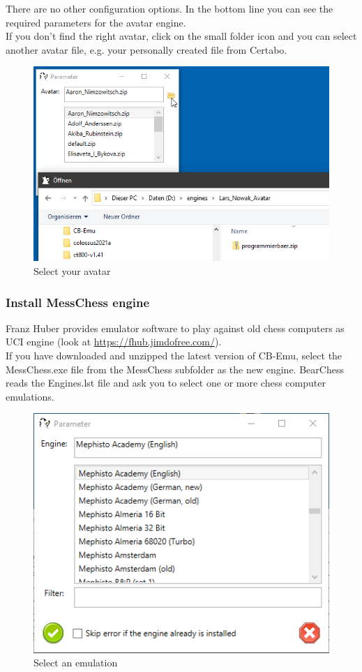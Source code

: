 \documentclass[11pt,a4paper]{article}
\begin{document}
	There are no other configuration options. In the bottom line you can see the required parameters for the avatar engine.\\
	If you don't find the right avatar, click on the small folder icon and you can select another avatar file, e.g. your personally created file from Certabo.
	
	\begin{figure}[H]
		\centering
		\includegraphics[scale=0.7]{avatar4.png}
		\caption{Select your avatar}
		\label{fig:Avatar4}
	\end{figure}
	
	\subsubsection{Install MessChess engine}
	Franz Huber provides emulator software to play against old chess computers as UCI engine (look at \url{https://fhub.jimdofree.com/}).\\
	If you have downloaded and unzipped the latest version of CB-Emu, select the MessChess.exe file from the MessChess subfolder as the new engine. BearChess reads the Engines.lst file and ask you to select one or more chess computer emulations.
	
	\begin{figure}[H]
		\centering
		\includegraphics[scale=0.8]{MessChess1.png}
		\caption{Select an emulation}
		\label{fig:MessChess1}
	\end{figure}
	
\end{document}
